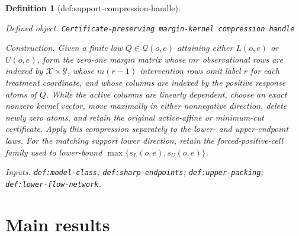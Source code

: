 \documentclass{article}
\newtheorem{definition}{Definition}
\begin{document}
\begin{definition}[def:support-compression-handle]\label{def:support-compression-handle}
\par\smallskip\noindent\emph{Defined object.} \texttt{Certificate-\allowbreak{}preserving margin-\allowbreak{}kernel compression handle}
\par\smallskip\noindent\emph{Construction.} Given a finite law \(Q\in\mathcal Q(o,e)\) attaining either \(L(o,e)\) or \(U(o,e)\), form the zero-one margin matrix whose \(mr\) observational rows are indexed by \(\mathcal X\times\mathcal Y\), whose \(m(r-1)\) intervention rows omit label \(r\) for each treatment coordinate, and whose columns are indexed by the positive response atoms of \(Q\). While the active columns are linearly dependent, choose an exact nonzero kernel vector, move maximally in either nonnegative direction, delete newly zero atoms, and retain the original active-affine or minimum-cut certificate. Apply this compression separately to the lower- and upper-endpoint laws. For the matching support lower direction, retain the forced-positive-cell family used to lower-bound \(\max\{s_L(o,e),s_U(o,e)\}\).
\par\smallskip\noindent\emph{Inputs.} \texttt{def:\allowbreak{}model-\allowbreak{}class}; \texttt{def:\allowbreak{}sharp-\allowbreak{}endpoints}; \texttt{def:\allowbreak{}upper-\allowbreak{}packing}; \texttt{def:\allowbreak{}lower-\allowbreak{}flow-\allowbreak{}network}.
\end{definition}

\section{Main results}
\end{document}
